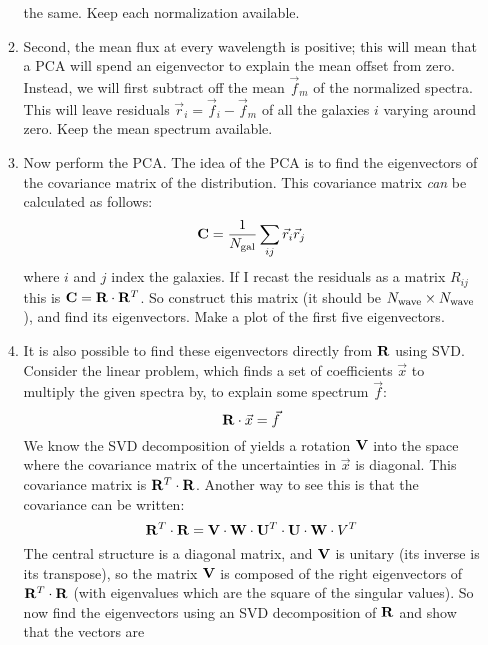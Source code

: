 \documentclass[11pt, preprint]{aastex}
\begin{document}
\begin{enumerate}
\begin{enumerate}
      the same. Keep each normalization available.
     \item Second, the mean flux at every wavelength is positive; this
       will mean that a PCA will spend an eigenvector to explain the
       mean offset from zero. Instead, we will first subtract off the
       mean $\vec{f}_m$ of the normalized spectra. This will leave
       residuals $\vec{r}_i = \vec{f}_i - \vec{f}_m$ of all the
       galaxies $i$ varying around zero. Keep the mean spectrum
       available.
     \item Now perform the PCA. The idea of the PCA is to find the
       eigenvectors of the covariance matrix of the distribution. This
       covariance matrix {\it can} be calculated as follows:
       \begin{equation}
         {\bf C} = \frac{1}{N_{\rm gal}} \sum_{ij} \vec{r}_i \vec{r}_j
       \end{equation}
       where $i$ and $j$ index the galaxies. If I recast the residuals
       as a matrix $R_{ij}$ this is ${\bf C} =
       {\bf R}\cdot{\bf R}^T$. So construct this matrix (it should be
       $N_{\rm wave}\times N_{\rm wave}$), and find its
       eigenvectors. Make a plot of the first five eigenvectors.
     \item It is also possible to find these eigenvectors directly
       from ${\bf R}$ using SVD. Consider the linear problem, which
       finds a set of coefficients $\vec{x}$ to multiply the given
       spectra by, to explain some spectrum $\vec{f}$:
       \begin{equation}
         {\bf R}\cdot\vec{x} = \vec{f}
       \end{equation}
       We know the SVD decomposition of  yields a rotation
       ${\bf V}$ into the space where the covariance matrix of the
       uncertainties in $\vec{x}$ is diagonal. This covariance matrix
       is ${\bf R}^T\cdot{\bf R}$. Another way to see this is that the
       covariance can be written:
       \begin{equation}
         {\bf R}^T\cdot{\bf R} =
         {\bf V}\cdot{\bf W}\cdot{\bf U}^T\cdot{\bf U}\cdot{\bf W}\cdot{V}^T
       \end{equation}
       The central structure is a diagonal matrix, and ${\bf V}$ is
       unitary (its inverse is its transpose), so the matrix ${\bf V}$
       is composed of the right eigenvectors of
       ${\bf R}^T\cdot{\bf R}$ (with eigenvalues which are the square
       of the singular values). So now find the eigenvectors using an
       SVD decomposition of ${\bf R}$ and show that the vectors are

\end{enumerate}
\end{enumerate}
\end{document}
